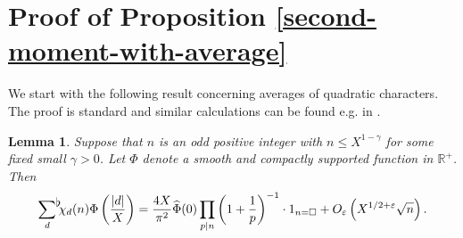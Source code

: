 \documentclass[a4paper,10pt,twoside]{amsart}
\newtheorem{lemma}[theorem]{Lemma}
\theoremstyle{definition}
\numberwithin{equation}{section}
\newcommand\R{\mathbb{R}}
\renewcommand\:{\colon}
\newcommand{\sumflat}{\mathop{{\sum}^{\raisebox{-3pt}{\makebox[0pt][l]{$\flat$}}}}}
\begin{document}
\section{Proof of Proposition \ref{second-moment-with-average}}

\noindent We start with the following result concerning averages of quadratic characters. The proof is standard and similar calculations can be found e.g. in \cite{Radziwill-Soundararajan2015, Lester-Radziwill2021, Jaasaari-Lester-Saha2022, Jaasaari-Lester-Saha2024}.

\begin{lemma}\label{d-summation}
Suppose that $n$ is an odd positive integer with $n\leq X^{1-\gamma}$ for some fixed small $\gamma>0$. Let $\Phi$ denote a smooth and compactly supported function in $\R^+$. Then
\[ 
\sumflat_d \chi_d(n)\Phi\left(\frac{|d|}X\right)= \frac{4X}{\pi^2}\widehat\Phi(0)\prod_{p|n}\left(1+\frac1p\right)^{-1}\cdot 1_{n=\square}+O_{\varepsilon}\left(X^{1/2+\varepsilon}\sqrt{n}\right). \]
\end{lemma}
\end{document}

